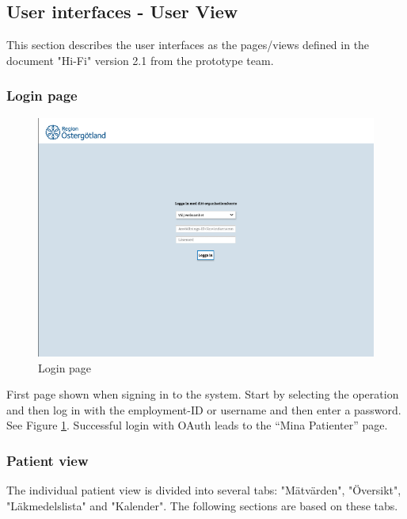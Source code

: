 \documentclass{scrreprt}
\begin{document}
\subsection{User interfaces -  User View}
This section describes the user interfaces as the pages/views defined in the document "Hi-Fi" version 2.1 from the prototype team.

\subsubsection{Login page}
\begin{figure}[h!]
    \centering
    \includegraphics[width=15cm]{login.png}
    \caption{Login page}
    \label{fig: login}
\end{figure}

First page shown when signing in to the system. Start by selecting the operation and then log in with the employment-ID or username and then enter a password. See Figure \ref{fig: login}. Successful login with OAuth leads to the “Mina Patienter” page. 

\subsubsection{Patient view}
The individual patient view is divided into several tabs: "Mätvärden", "Översikt", "Läkmedelslista" and  "Kalender". The following sections are based on these tabs. 
\end{document}
